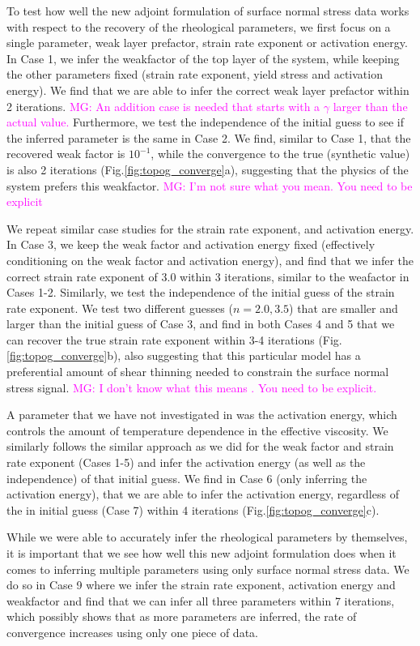 \documentclass[12pt]{article}
\newcommand{\mgnote}[1]{\textcolor{magenta}{MG: #1}}
\begin{document}
To test how well the new adjoint formulation of surface normal stress data works with respect to the recovery of the rheological parameters, we first focus on a single parameter, weak layer prefactor, strain rate exponent or activation energy. In Case 1, we infer the weakfactor of the top layer of the system, while keeping the other parameters fixed (strain rate exponent, yield stress and activation energy). We find that we are able to infer the correct weak layer prefactor within 2 iterations. 
\mgnote{An addition case is needed that starts with a $\gamma$ larger than the actual value.}
Furthermore, we test the independence of the initial guess to see if the inferred parameter is the same in Case 2. We find, similar to Case 1, that the recovered weak factor is $10^{-1}$, while the convergence to the true (synthetic value) is also 2 iterations (Fig.\ref{fig:topog_converge}a), 
suggesting that the physics of the system prefers this weakfactor.
\mgnote{I'm not sure what you mean. You need to be explicit}

We repeat similar case studies for the strain rate exponent, and activation energy. In Case 3, we keep the weak factor and activation energy fixed (effectively conditioning on the weak factor and activation energy), and find that we infer the correct strain rate exponent of 3.0 within 3 iterations, similar to the weafactor in Cases 1-2. Similarly, we test the independence of the initial guess of the strain rate exponent. We test two different guesses ($n=2.0,3.5$) that are smaller and larger than the initial guess of Case 3, and find in both Cases 4 and 5 that we can recover the true strain rate exponent within 3-4 iterations (Fig.\ref{fig:topog_converge}b), 
also suggesting that this particular model has a preferential amount of shear thinning needed to constrain the surface normal stress signal.
\mgnote{I don't know what this means . You need to be explicit.}

A parameter that we have not investigated in \citep{ratnaswamy2015adjoint} was the activation energy, which controls the amount of temperature dependence in the effective viscosity. We similarly follows the similar approach as we did for the weak factor and strain rate exponent (Cases 1-5) and infer the activation energy (as well as the independence) of that initial guess. We find in Case 6 (only inferring the activation energy), that  we are able to infer the activation energy, regardless of the in initial guess (Case 7) within 4 iterations (Fig.\ref{fig:topog_converge}c). 

While we were able to accurately infer the rheological parameters by themselves, it is important that we see how well this new adjoint formulation does when it comes to inferring multiple parameters using only surface normal stress data. We do so in Case 9 where we  infer the strain rate exponent, activation energy and weakfactor and find that we can infer all three parameters within 7 iterations, which possibly shows that as more parameters are inferred, the rate of convergence increases using only one piece of data.
\end{document}

